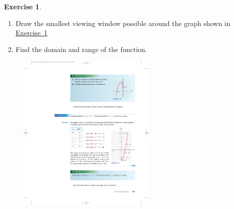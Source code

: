 \documentclass[10pt,]{book}
\theoremstyle{plain}
\theoremstyle{definition}
\theoremstyle{definition}
\theoremstyle{definition}
\theoremstyle{definition}
\theoremstyle{definition}
\newtheorem{exercise}[theorem]{Exercise}
\numberwithin{equation}{section}
\begin{document}
\begin{exercise}\label{exercise-domain-and-range-from-graph}
\leavevmode%
\begin{enumerate}[label=*\alph**]
\item\hypertarget{li-379}{}Draw the smallest viewing window possible around the graph shown in \hyperref[exercise-domain-and-range-from-graph]{Exercise~\ref{exercise-domain-and-range-from-graph}}\item\hypertarget{li-380}{}Find the domain and range of the function.\end{enumerate}
\leavevmode%
\begin{figure}
\centering
\includegraphics[width=0.60\textwidth,]{images/fig-domain-and-range-from-graph3.pdf}\caption{\label{fig-domain-and-range-from-graph3}}
\end{figure}
\end{exercise}
\par
\end{document}
